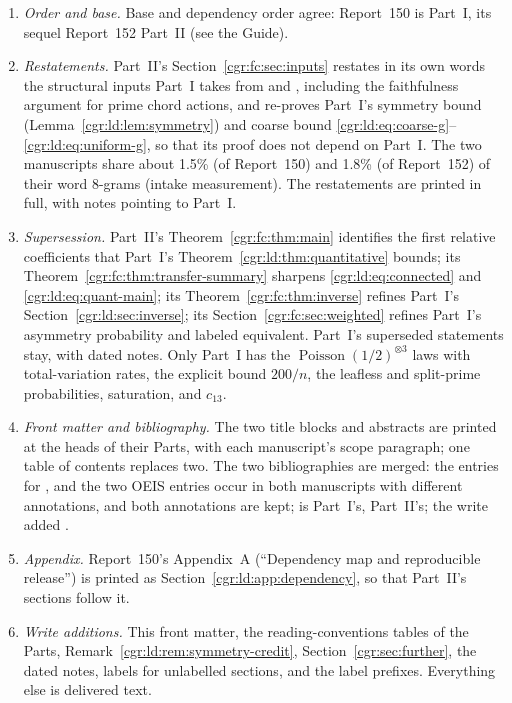 \documentclass[11pt,letterpaper]{article}
\numberwithin{equation}{section}
\theoremstyle{definition}\newtheorem{definition}[theorem]{Definition}
\theoremstyle{remark}\newtheorem{remark}[theorem]{Remark}
\DeclareMathOperator{\Poi}{Poisson}
\begin{document}
\begin{enumerate}
\item \emph{Order and base.} Base and dependency order agree: Report~150 is Part~I, its sequel Report~152 Part~II (see the Guide).
\item \emph{Restatements.} Part~II's Section~\ref{cgr:fc:sec:inputs} restates in its own words the structural inputs Part~I takes from \cite{BBFGP24} and \cite{KZ15}, including the faithfulness argument for prime chord actions, and re-proves Part~I's symmetry bound (Lemma~\ref{cgr:ld:lem:symmetry}) and coarse bound \eqref{cgr:ld:eq:coarse-g}--\eqref{cgr:ld:eq:uniform-g}, so that its proof does not depend on Part~I. The two manuscripts share about 1.5\% (of Report~150) and 1.8\% (of Report~152) of their word 8-grams (intake measurement). The restatements are printed in full, with notes pointing to Part~I.
\item \emph{Supersession.} Part~II's Theorem~\ref{cgr:fc:thm:main} identifies the first relative coefficients that Part~I's Theorem~\ref{cgr:ld:thm:quantitative} bounds; its Theorem~\ref{cgr:fc:thm:transfer-summary} sharpens \eqref{cgr:ld:eq:connected} and \eqref{cgr:ld:eq:quant-main}; its Theorem~\ref{cgr:fc:thm:inverse} refines Part~I's Section~\ref{cgr:ld:sec:inverse}; its Section~\ref{cgr:fc:sec:weighted} refines Part~I's asymmetry probability and labeled equivalent. Part~I's superseded statements stay, with dated notes. Only Part~I has the $\Poi(1/2)^{\otimes3}$ laws with total-variation rates, the explicit bound $200/n$, the leafless and split-prime probabilities, saturation, and $c_{13}$.
\item \emph{Front matter and bibliography.} The two title blocks and abstracts are printed at the heads of their Parts, with each manuscript's scope paragraph; one table of contents replaces two. The two bibliographies are merged: the entries for \cite{BBFGP24}, \cite{KZ15} and the two OEIS entries occur in both manuscripts with different annotations, and both annotations are kept; \cite{DP09} is Part~I's, \cite{GP12} Part~II's; the write added \cite{TSvol}.
\item \emph{Appendix.} Report~150's Appendix~A (``Dependency map and reproducible release'') is printed as Section~\ref{cgr:ld:app:dependency}, so that Part~II's sections follow it.
\item \emph{Write additions.} This front matter, the reading-conventions tables of the Parts, Remark~\ref{cgr:ld:rem:symmetry-credit}, Section~\ref{cgr:sec:further}, the dated notes, labels for unlabelled sections, and the label prefixes. Everything else is delivered text.
\end{enumerate}
\end{document}
